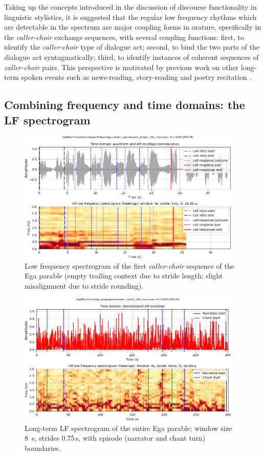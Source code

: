 \documentclass[output=paper,colorlinks,citecolor=brown]{langscibook}
\begin{document}
Taking up the concepts introduced in the discussion of discourse functionality in linguistic stylistics, it is suggested that the regular low frequency rhythms which are detectable in the spectrum are major coupling forms in orature, specifically in the \textit{caller-choir} exchange sequences, with several coupling functions: first, to identify the \textit{caller-choir} type of dialogue act; second, to bind the two parts of the dialogue act syntagmatically; third, to identify instances of coherent sequences of \textit{caller-choir} pairs. This perspective is motivated by previous work on other long-term spoken events such as news-reading, story-reading and poetry recitation \citep{gibbonjipa2021, gibbon4urua2022, gibbonsp2022}.

\subsection{Combining frequency and time domains: the LF spectrogram}

\begin{figure}[ht]
\centering
\includegraphics[trim={1.5cm 1cm 0 0}, clip, width=0.95\textwidth]{gibbon_figure07.png}
\caption{\label{fig:fig07}Low frequency spectrogram of the first \textit{caller-choir} sequence of the Ega parable (empty trailing context due to stride length; slight misalignment due to stride rounding).}
\end{figure}
\begin{figure}[ht]
\centering
\includegraphics[trim={1.5cm 1cm 0 0}, clip, width=0.95\textwidth]{gibbon_figure08.png}
\caption{\label{fig:fig08}Long-term LF spectrogram of the entire Ega parable; window size 8 s, strides 0.75\,s, with episode (narrator and chant turn) boundaries.}
\end{figure}
\end{document}
